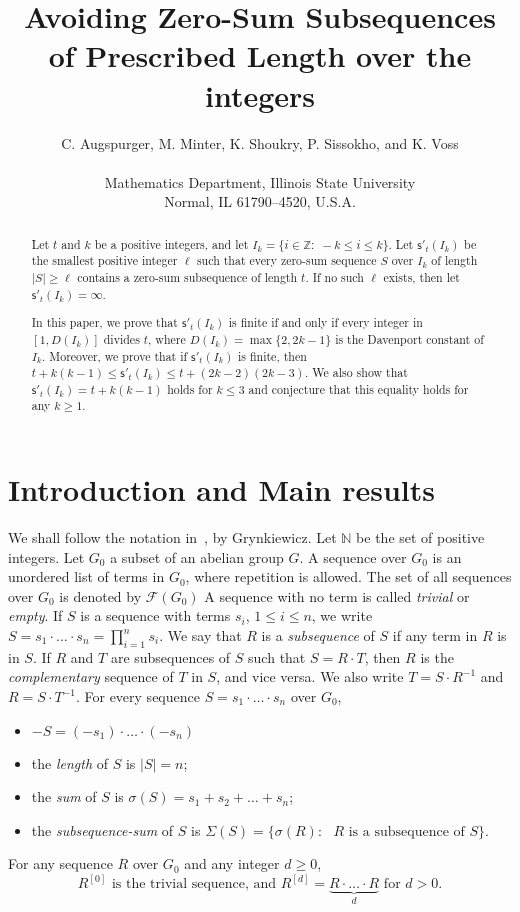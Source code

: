 \documentclass[12 pt]{amsart}
\title{Avoiding Zero-Sum Subsequences of Prescribed Length over the integers
}
\author[C. Augspurger et al.]{C. Augspurger, M. Minter, K. Shoukry, P. Sissokho, and K. Voss\\ \\
	Mathematics Department, Illinois State University \\
	Normal, IL 61790--4520, U.S.A.}
\def \F{\mathcal F}
\def \N{\mathbb N}
\def \m{\mathsf{s}'}
\begin{document}
%
\begin{abstract}
Let $t$ and $k$ be a positive integers, and let $I_k=\{i\in \mathbb{Z}:\; -k\leq i\leq k\}$. 
Let $\mathsf{s}'_t(I_k)$ be the smallest positive integer $\ell$ such that every zero-sum sequence $S$ over $I_k$ of length $|S|\ge \ell$ contains a zero-sum subsequence of length $t$. If no such $\ell$ exists, then let $\m_t(I_k)=\infty$.

In this paper, we prove that $\mathsf{s}'_t(I_k)$ is finite if and only if every integer in $[1,D(I_k)]$ divides $t$, where $D(I_k)=\max\{2,2k-1\}$ is the Davenport constant of $I_k$. Moreover, we prove that if  $\mathsf{s}'_t(I_k)$ is finite, then $t+k(k-1)\leq \mathsf{s}'_t(I_k)\leq t+(2k-2)(2k-3)$. We also show that $\mathsf{s}'_t(I_k)=t+k(k-1)$ holds for $k\leq 3$ and 
conjecture that this equality holds for any $k\geq1$.
\end{abstract}
%
\maketitle
\section{Introduction and Main results}\label{sec:intro}
We shall follow the notation in~\cite{Gr}, by Grynkiewicz.
Let $\N$ be the set of positive integers. Let $G_0$ a subset of an abelian group $G$.
A sequence over $G_0$ is an unordered list of terms in $G_0$,
where repetition is allowed. The 
set of all sequences over $G_0$ is denoted by 
$\F(G_0)$
A sequence with no term is called {\em trivial} or {\em empty}. 
If $S$ is a sequence with terms $s_i$, $1\leq i\leq n$, we 
write $S=s_1\cdot\ldots\cdot s_n=\prod_{i=1}^n s_i$.
We say that $R$ is a {\em subsequence} of $S$ if any term in 
$R$ is in $S$. If $R$ and $T$ are subsequences
of $S$ such that $S=R\cdot T$, then $R$ is the {\em complementary} sequence of $T$ in $S$, and vice versa. We also write $T=S\cdot R^{-1}$ and $R=S\cdot T^{-1}$. For every sequence $S=s_1\cdot\ldots\cdot s_n$ over $G_0$, 
%
\begin{itemize}
\item $-S=(-s_1)\cdot\ldots\cdot (-s_n)$ 
\item the {\em length} of $S$ is $|S|=n$;
\item the {\em sum} of $S$ is $\sigma(S)=s_1+s_2+\ldots+s_n$;
\item the {\em subsequence-sum} of $S$ is  $\Sigma(S)=\{\sigma(R):\mbox{ $R$ is a subsequence of $S$}\}$.
\end{itemize}
For any sequence $R$ over $G_0$ and any integer $d\geq 0$, 
\[\mbox{$R^{[0]}$ is the trivial sequence, and $R^{[d]}=\underbrace{R\cdot\ldots\cdot R}_d$ for $d>0$.}\]
\end{document}
